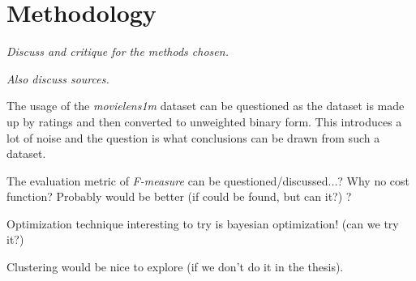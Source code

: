 

\section{Methodology}\label{sec:disc:method}

\textit{Discuss and critique for the methods chosen.}

\textit{Also discuss sources.}

The usage of the \textit{movielens1m} dataset can be questioned as the dataset is made up by ratings and then converted to unweighted binary form. This introduces a lot of noise and the question is what conclusions can be drawn from such a dataset.

The evaluation metric of \textit{F-measure} can be questioned/discussed...? Why no cost function? Probably would be better (if could be found, but can it?) ?

Optimization technique interesting to try is bayesian optimization! (can we try it?)

Clustering would be nice to explore (if we don't do it in the thesis).

